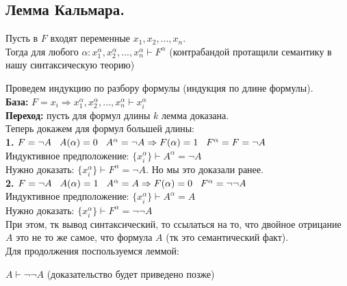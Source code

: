 \subsection{Лемма Кальмара.}
\begin{theorem} \label{th:Kalmar} 
\noindent Пусть в $F$ входят переменные $x_1,x_2,...,x_n$.\\ Тогда для любого $\alpha :  x_1^{\alpha},x_2^{\alpha},...,x_n^{\alpha} \vdash F^{\alpha} $ (контрабандой протащили семантику в нашу синтаксическую теорию)
\end{theorem}
\beginproof Проведем индукцию по разбору формулы (индукция по длине формулы).\\
\textbf{База:} $F = x_i \Rightarrow x_1^{\alpha},x_2^{\alpha},...,x_n^{\alpha} \vdash x_i^{\alpha} $\\
\textbf{Переход:} пусть для формул длины $k$ лемма доказана.\\
\vspace{3mm}
Теперь докажем для формул большей длины:\\
\textbf{1.} $F = \neg A \hspace{3mm} A(\alpha) = 0 \hspace{3mm} A^{\alpha} = \neg A \Rightarrow F(\alpha) = 1 \hspace{3mm} F^{\alpha} = F = \neg A$\\
Индуктивное предположение: $\{x_i^{\alpha}\}\vdash A^{\alpha} = \neg A$\\
\vspace{3mm}
Нужно доказать: $\{x_i^{\alpha}\}\vdash F^{\alpha} = \neg A$.
Но мы это доказали ранее.\\
\textbf{2.} $F = \neg A \hspace{3mm} A(\alpha) = 1 \hspace{3mm} A^{\alpha} = A \Rightarrow F(\alpha) = 0 \hspace{3mm} F^{\alpha} = \neg \neg A$\\
Индуктивное предположение: $\{x_i^{\alpha}\}\vdash A^{\alpha} =  A$\\
Нужно доказать: $\{x_i^{\alpha}\}\vdash F^{\alpha} =\neg \neg A$\\
При этом, тк вывод синтаксический, то ссылаться на то, что двойное отрицание $A$ это не то же самое, что формула $A$ (тк это семантический факт).\\
\newpage
Для продолжения поспользуемся леммой:
\begin{lemma}
$A \vdash \neg \neg A$ (доказательство будет приведено позже)
\end{lemma}
